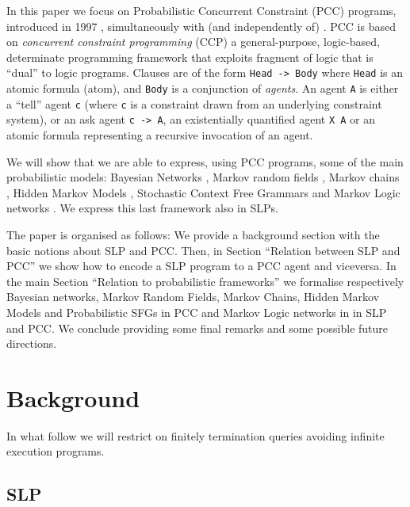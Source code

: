 \documentclass[letterpaper]{article}
\theoremstyle{plain}
\theoremstyle{definition}
\theoremstyle{remark}
\theoremstyle{definition}
\begin{document}
In this paper we focus on Probabilistic Concurrent Constraint (PCC) programs, introduced in 1997 \cite{PCC}, simultaneously with (and independently of) \cite{SLPmuggleton96}. PCC is based on {\em concurrent constraint programming} (CCP) a general-purpose, logic-based, determinate programming framework that exploits fragment of logic that is ``dual'' to logic programs. Clauses are of the form {\tt Head -> Body} where {\tt Head} is an atomic formula (atom), and {\tt Body} is a conjunction of {\em agents}. An agent {\tt A} is either a ``tell'' agent {\tt c} (where {\tt c} is a constraint drawn from an underlying constraint system), or an ask agent {\tt c -> A}, an existentially quantified agent {\tt X \Hat A} or an atomic formula representing a recursive invocation of an agent. 

We will show that we are able to express, using PCC programs, some of the main probabilistic models: 
Bayesian Networks  \cite{d1999inference,dechter1999bucket,B5} , Markov random fields \cite{MarkovRandomField}, Markov chains \cite{MarkovChain}, Hidden Markov Models \cite{MarkovChain}, Stochastic Context Free Grammars \cite{SCFG_1,SCFG_2} and Markov Logic networks \cite{markovLogicNetworks}. We express this last framework also in SLPs.


The paper is organised as follows: We provide a background section with the basic notions about SLP and PCC. Then, in Section ``Relation between SLP and PCC'' we show how to encode a SLP program to a PCC agent and viceversa.
In the main Section ``Relation to probabilistic frameworks'' we formalise respectively Bayesian networks, Markov Random Fields, Markov Chains,  Hidden Markov Models and Probabilistic SFGs in PCC and Markov Logic networks in in SLP and PCC.
We conclude providing some final remarks and some possible future directions.


\section{Background}
In what follow we will restrict on finitely termination queries avoiding infinite execution programs.
\subsection{SLP}
\end{document}
